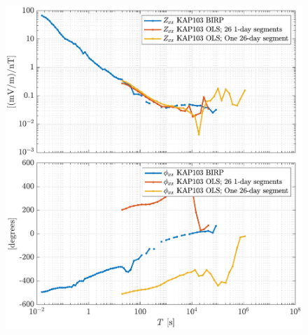 \documentclass{article}
\begin{document}
\begin{figure}[h!]
\centering
\includegraphics[width=\textwidth]{figures/KAP103_Middelpos/transferfnZ_compare-Z_xx_Magnitude_Phase.pdf}
\caption{}
\label{fig:universe}
\end{figure}
\end{document}
